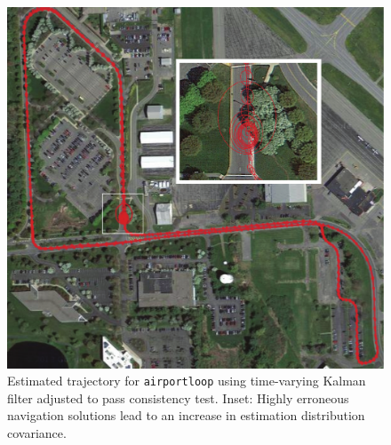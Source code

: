 \begin{figure}
\includegraphics[width=\columnwidth]{airportloop_map}
\caption{Estimated trajectory for \texttt{airportloop} using time-varying Kalman filter adjusted to pass consistency test.  Inset: Highly erroneous navigation solutions lead to an increase in estimation distribution covariance.}
\label{fig:airportloop_map}
\end{figure} 

